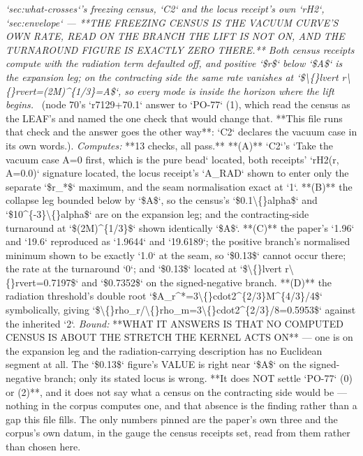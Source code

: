 \begin{description}
\textit{`sec:what-crosses`'s freezing census, `C2` and the locus receipt's own `rH2`, `sec:envelope` ---  **THE FREEZING CENSUS IS THE VACUUM CURVE'S OWN RATE, READ ON THE BRANCH THE LIFT IS NOT ON, AND THE TURNAROUND FIGURE IS EXACTLY ZERO THERE.** Both census receipts compute with the radiation term defaulted off, and positive `\$r\$` below `\$A\$` is the expansion leg; on the contracting side the same rate vanishes at `\$\textbackslash\{\}lvert r\textbackslash\{\}rvert=(2M)\textasciicircum{}\{1/3\}=A\$`, so every mode is inside the horizon where the lift begins.} \ (node 70's `r7129+70.1` answer to `PO-77` (1), which read the census as the LEAF's and named the one check that would change that. **This file runs that check and the answer goes the other way**: `C2` declares the vacuum case in its own words.). 
\emph{Computes:} **13 checks, all pass.** **(A)** `C2`'s `Take the vacuum case A=0 first, which is the pure bead` located, both receipts' `rH2(r, A=0.0)` signature located, the locus receipt's `A\_RAD` shown to enter only the separate `\$r\_*\$` maximum, and the seam normalisation exact at `1`. **(B)** the collapse leg bounded below by `\$A\$`, so the census's `\$0.1\textbackslash\{\}alpha\$` and `\$10\textasciicircum{}\{-3\}\textbackslash\{\}alpha\$` are on the expansion leg; and the contracting-side turnaround at `\$(2M)\textasciicircum{}\{1/3\}\$` shown identically `\$A\$`. **(C)** the paper's `1.96` and `19.6` reproduced as `1.9644` and `19.6189`; the positive branch's normalised minimum shown to be exactly `1.0` at the seam, so `\$0.13\$` cannot occur there; the rate at the turnaround `0`; and `\$0.13\$` located at `\$\textbackslash\{\}lvert r\textbackslash\{\}rvert=0.7197\$` and `\$0.7352\$` on the signed-negative branch. **(D)** the radiation threshold's double root `\$A\_r\textasciicircum{}*=3\textbackslash\{\}cdot2\textasciicircum{}\{2/3\}M\textasciicircum{}\{4/3\}/4\$` symbolically, giving `\$\textbackslash\{\}rho\_r/\textbackslash\{\}rho\_m=3\textbackslash\{\}cdot2\textasciicircum{}\{2/3\}/8=0.5953\$` against the inherited `2`.
 \emph{Bound:}  **WHAT IT ANSWERS IS THAT NO COMPUTED CENSUS IS ABOUT THE STRETCH THE KERNEL ACTS ON** --- one is on the expansion leg and the radiation-carrying description has no Euclidean segment at all.  The `\$0.13\$` figure's VALUE is right near `\$A\$` on the signed-negative branch; only its stated locus is wrong.  **It does NOT settle `PO-77` (0) or (2)**, and it does not say what a census on the contracting side would be --- nothing in the corpus computes one, and that absence is the finding rather than a gap this file fills.  The only numbers pinned are the paper's own three and the corpus's own datum, in the gauge the census receipts set, read from them rather than chosen here.

\end{description}
